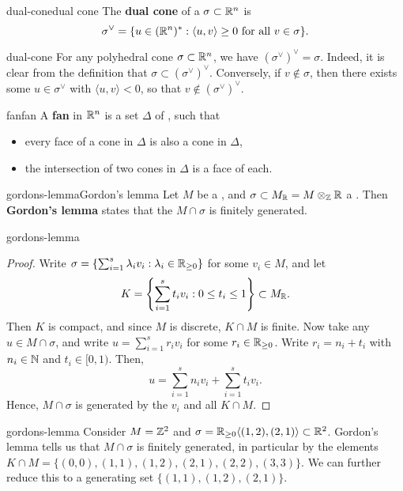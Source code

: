 \begin{topic}{dual-cone}{dual cone}
    The \textbf{dual cone} of a  $\sigma \subset \mathbb{R}^n$ is
    \[ \sigma^\vee = \{ u \in (\mathbb{R}^n)^* : \langle u, v \rangle \ge 0 \text{ for all } v \in \sigma \} . \]
\end{topic}

\begin{example}{dual-cone}
    For any polyhedral cone $\sigma \subset \mathbb{R}^n$, we have $(\sigma^\vee)^\vee = \sigma$. Indeed, it is clear from the definition that $\sigma \subset (\sigma^\vee)^\vee$. Conversely, if $v \not\in \sigma$, then there exists some $u \in \sigma^\vee$ with $\langle u, v \rangle < 0$, so that $v \not\in (\sigma^\vee)^\vee$.
\end{example}

\begin{topic}{fan}{fan}
    A \textbf{fan} in $\mathbb{R}^n$ is a set $\Delta$ of , such that
    \begin{itemize}
        \item every face of a cone in $\Delta$ is also a cone in $\Delta$,
        \item the intersection of two cones in $\Delta$ is a face of each.
    \end{itemize}
\end{topic}

\begin{topic}{gordons-lemma}{Gordon's lemma}
    Let $M$ be a  , and $\sigma \subset M_{\mathbb{R}} = M \otimes_{\mathbb{Z}} \mathbb{R}$ a . Then \textbf{Gordon's lemma} states that the  $M \cap \sigma$ is finitely generated.
\end{topic}

\begin{example}{gordons-lemma}
    \begin{proof}
        Write $\sigma = \left\{ \sum_{i = 1}^{s} \lambda_i v_i : \lambda_i \in \mathbb{R}_{\ge 0} \right\}$ for some $v_i \in M$, and let
        \[ K = \left\{ \sum_{i = 1}^{s} t_i v_i : 0 \le t_i \le 1 \right\} \subset M_{\mathbb{R}} . \]
        Then $K$ is compact, and since $M$ is discrete, $K \cap M$ is finite. Now take any $u \in M \cap \sigma$, and write $u = \sum_{i = 1}^{s} r_i v_i$ for some $r_i \in \mathbb{R}_{\ge 0}$. Write $r_i = n_i + t_i$ with $n_i \in \mathbb{N}$ and $t_i \in [0, 1)$. Then,
        \[ u = \sum_{i = 1}^{s} n_i v_i + \sum_{i = 1}^{s} t_i v_i . \]
        Hence, $M \cap \sigma$ is generated by the $v_i$ and all $K \cap M$.
    \end{proof}
\end{example}

\begin{example}{gordons-lemma}
    Consider $M = \mathbb{Z}^2$ and $\sigma = \mathbb{R}_{\ge 0} \langle (1, 2), (2, 1) \rangle \subset \mathbb{R}^2$. Gordon's lemma tells us that $M \cap \sigma$ is finitely generated, in particular by the elements $K \cap M = \{ (0, 0), (1, 1), (1, 2), (2, 1), (2, 2), (3, 3) \}$. We can further reduce this to a generating set $\{ (1, 1), (1, 2), (2, 1) \}$.
\end{example}
